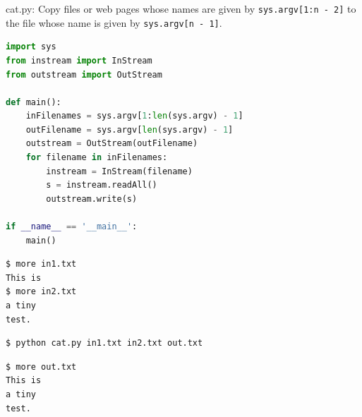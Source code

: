 \documentclass[8pt,a4paper,compress]{beamer}
\begin{document}
\begin{frame}[fragile]
\pause

\begin{framed}
\tiny cat.py: Copy files or web pages whose names are given by \lstinline{sys.argv[1:n - 2]} to the file whose name is given by \lstinline{sys.argv[n - 1]}.
\end{framed}

\begin{lstlisting}[language=Python]
import sys
from instream import InStream
from outstream import OutStream

def main():
    inFilenames = sys.argv[1:len(sys.argv) - 1]
    outFilename = sys.argv[len(sys.argv) - 1]
    outstream = OutStream(outFilename)
    for filename in inFilenames:
        instream = InStream(filename)
        s = instream.readAll()
        outstream.write(s)

if __name__ == '__main__':
    main()
\end{lstlisting}

\pause

\begin{lstlisting}[language={}]
$ more in1.txt
This is
$ more in2.txt
a tiny
test.
\end{lstlisting}

\pause

\begin{lstlisting}[language={}]
$ python cat.py in1.txt in2.txt out.txt
\end{lstlisting}

\pause

\begin{lstlisting}[language={}]
$ more out.txt
This is
a tiny
test.
\end{lstlisting}
\end{frame}
\end{document}
